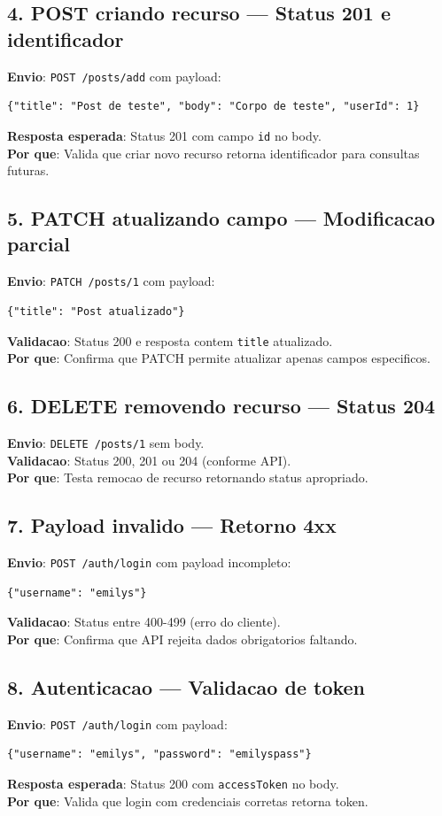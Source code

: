 \documentclass[11pt,a4paper]{article}
\begin{document}
\subsection{4. POST criando recurso --- Status 201 e identificador}
\textbf{Envio}: \texttt{POST /posts/add} com payload:
\begin{lstlisting}
{"title": "Post de teste", "body": "Corpo de teste", "userId": 1}
\end{lstlisting}
\textbf{Resposta esperada}: Status 201 com campo \texttt{id} no body. \\
\textbf{Por que}: Valida que criar novo recurso retorna identificador para consultas futuras.

\subsection{5. PATCH atualizando campo --- Modificacao parcial}
\textbf{Envio}: \texttt{PATCH /posts/1} com payload:
\begin{lstlisting}
{"title": "Post atualizado"}
\end{lstlisting}
\textbf{Validacao}: Status 200 e resposta contem \texttt{title} atualizado. \\
\textbf{Por que}: Confirma que PATCH permite atualizar apenas campos especificos.

\subsection{6. DELETE removendo recurso --- Status 204}
\textbf{Envio}: \texttt{DELETE /posts/1} sem body. \\
\textbf{Validacao}: Status 200, 201 ou 204 (conforme API). \\
\textbf{Por que}: Testa remocao de recurso retornando status apropriado.

\subsection{7. Payload invalido --- Retorno 4xx}
\textbf{Envio}: \texttt{POST /auth/login} com payload incompleto:
\begin{lstlisting}
{"username": "emilys"}
\end{lstlisting}
\textbf{Validacao}: Status entre 400-499 (erro do cliente). \\
\textbf{Por que}: Confirma que API rejeita dados obrigatorios faltando.

\subsection{8. Autenticacao --- Validacao de token}
\textbf{Envio}: \texttt{POST /auth/login} com payload:
\begin{lstlisting}
{"username": "emilys", "password": "emilyspass"}
\end{lstlisting}
\textbf{Resposta esperada}: Status 200 com \texttt{accessToken} no body. \\
\textbf{Por que}: Valida que login com credenciais corretas retorna token.
\end{document}
